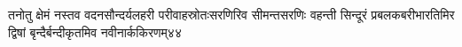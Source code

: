 \fourlineindentedshlokanum
{तनोतु क्षेमं नस्तव वदनसौन्दर्यलहरी}
{परीवाहस्रोतःसरणिरिव सीमन्तसरणिः}
{वहन्ती सिन्दूरं प्रबलकबरीभारतिमिर}
{द्विषां बृन्दैर्बन्दीकृतमिव नवीनार्ककिरणम्}{४४}

%
%
%
%
%
%
%
%
%
%
%
%
